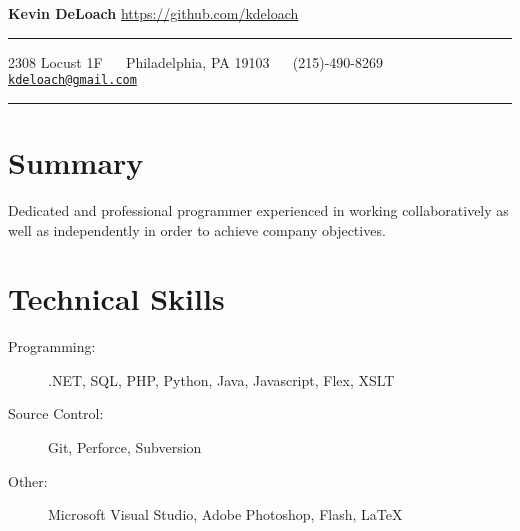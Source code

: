 \documentclass[11pt]{article}
\newcommand{\spacer}{ \textbullet \ \ }
\begin{document}
\noindent
{\Huge\bfseries Kevin DeLoach} \hfill
\url{https://github.com/kdeloach}

\vspace{1em}
\hrule

\begin{center}
    2308 Locust 1F         \spacer
    Philadelphia, PA 19103 \spacer
    (215)-490-8269         \spacer
    \href{mailto:kdeloach@gmail.com}{\texttt{kdeloach@gmail.com}}
\end{center}

\vspace{-0.5em}
\hrule

\section*{Summary}

Dedicated and professional programmer experienced in working collaboratively as well as independently
in order to achieve company objectives.

\section*{Technical Skills}
\begin{description}
    \item[Programming:]%
        .NET, SQL, PHP, Python, Java, Javascript, Flex, XSLT
    \item[Source Control:]%
        Git, Perforce, Subversion
    \item[Other:]%
        Microsoft Visual Studio, Adobe Photoshop, Flash, \LaTeX
\end{description}
\end{document}
